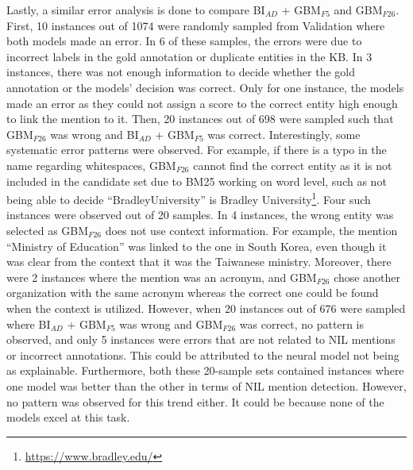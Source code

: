 \documentclass{report}
\theoremstyle{definition}
\theoremstyle{remark}
\begin{document}
Lastly, a similar error analysis is done to compare BI$_{AD}$ + GBM$_{F5}$ and GBM$_{F26}$. First, 10 instances out of 1074 were randomly sampled from Validation where both models made an error. In 6 of these samples, the errors were due to incorrect labels in the gold annotation or duplicate entities in the KB. In 3 instances, there was not enough information to decide whether the gold annotation or the models' decision was correct. Only for one instance, the models made an error as they could not assign a score to the correct entity high enough to link the mention to it. Then, 20 instances out of 698 were sampled such that GBM$_{F26}$ was wrong and BI$_{AD}$ + GBM$_{F5}$ was correct. Interestingly, some systematic error patterns were observed. For example, if there is a typo in the name regarding whitespaces, GBM$_{F26}$ cannot find the correct entity as it is not included in the candidate set due to BM25 working on word level, such as not being able to decide ``BradleyUniversity'' is Bradley University\footnote{\url{https://www.bradley.edu/}}. Four such instances were observed out of 20 samples. In 4 instances, the wrong entity was selected as GBM$_{F26}$ does not use context information. For example, the mention ``Ministry of Education'' was linked to the one in South Korea, even though it was clear from the context that it was the Taiwanese ministry. Moreover, there were 2 instances where the mention was an acronym, and GBM$_{F26}$ chose another organization with the same acronym whereas the correct one could be found when the context is utilized. However, when 20 instances out of 676 were sampled where BI$_{AD}$ + GBM$_{F5}$ was wrong and GBM$_{F26}$ was correct, no pattern is observed, and only 5 instances were errors that are not related to NIL mentions or incorrect annotations. This could be attributed to the neural model not being as explainable. Furthermore, both these 20-sample sets contained instances where one model was better than the other in terms of NIL mention detection. However, no pattern was observed for this trend either. It could be because none of the models excel at this task.
\end{document}
